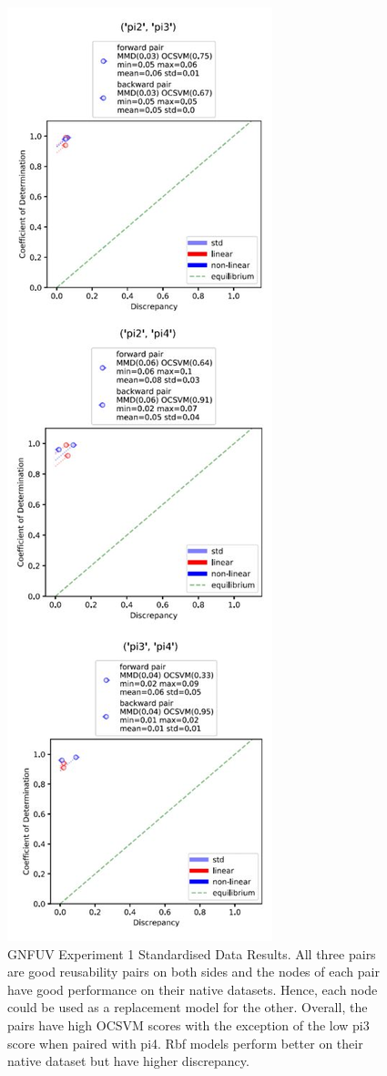 \documentclass{mpaper}
\begin{document}
\begin{figure}
    \centering
    \includegraphics[scale = 0.7]{experiment_1_std.jpg}
    \caption{GNFUV Experiment 1 Standardised Data Results. All three pairs are good reusability pairs on both sides and the nodes of each pair have good performance on their native datasets. Hence, each node could be used as a replacement model for the other. Overall, the pairs have high OCSVM scores with the exception of the low pi3 score when paired with pi4. Rbf models perform better on their native dataset but have higher discrepancy.}
    \label{fig:gnfuv_exp1_std}
\end{figure}
\end{document}
